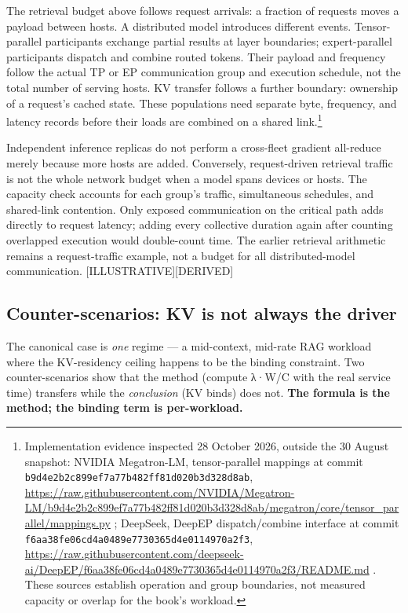 The retrieval budget above follows request arrivals: a fraction of
requests moves a payload between hosts. A distributed model introduces
different events. Tensor-parallel participants exchange partial results
at layer boundaries; expert-parallel participants dispatch and combine
routed tokens. Their payload and frequency follow the actual TP or EP
communication group and execution schedule, not the total number of
serving hosts. KV transfer follows a further boundary: ownership of a
request's cached state. These populations need separate byte, frequency,
and latency records before their loads are combined on a shared
link.\footnote{Implementation evidence inspected 28 October 2026,
  outside the 30 August snapshot: NVIDIA Megatron-LM, tensor-parallel
  mappings at commit \texttt{b9d4e2b2c899ef7a77b482ff81d020b3d328d8ab},
  \url{https://raw.githubusercontent.com/NVIDIA/Megatron-LM/b9d4e2b2c899ef7a77b482ff81d020b3d328d8ab/megatron/core/tensor_parallel/mappings.py}
  ; DeepSeek, DeepEP dispatch/combine interface at commit
  \texttt{f6aa38fe06cd4a0489e7730365d4e0114970a2f3},
  \url{https://raw.githubusercontent.com/deepseek-ai/DeepEP/f6aa38fe06cd4a0489e7730365d4e0114970a2f3/README.md}
  . These sources establish operation and group boundaries, not measured
  capacity or overlap for the book's workload.}

Independent inference replicas do not perform a cross-fleet gradient
all-reduce merely because more hosts are added. Conversely,
request-driven retrieval traffic is not the whole network budget when a
model spans devices or hosts. The capacity check accounts for each
group's traffic, simultaneous schedules, and shared-link contention.
Only exposed communication on the critical path adds directly to request
latency; adding every collective duration again after counting
overlapped execution would double-count time. The earlier retrieval
arithmetic remains a request-traffic example, not a budget for all
distributed-model communication. \mbox{{[}ILLUSTRATIVE{]}}\hspace{0pt}\mbox{{[}DERIVED{]}}

\subsection{Counter-scenarios: KV is not always the
driver}\label{counter-scenarios-kv-is-not-always-the-driver}

The canonical case is \emph{one} regime --- a mid-context, mid-rate RAG
workload where the KV-residency ceiling happens to be the binding
constraint. Two counter-scenarios show that the method (compute λ·W/C
with the real service time) transfers while the \emph{conclusion} (KV
binds) does not. \textbf{The formula is the method; the binding term is
per-workload.}

